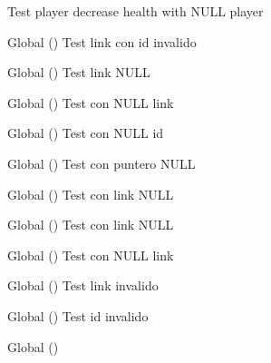 \begin{DoxyRefList}
\label{test__test000091}%
%
Test player decrease health with NULL player  
\item[Global \doxylink{link__test_8c_a24b5463da176c3e578b0a0fa8bb1f9f0}{test2\+\_\+link\+\_\+create} ()]\label{test__test000031}%
%
Test link con id invalido  
\item[Global \doxylink{link__test_8c_a63dbcd55ed0913dea30eba35884b5558}{test2\+\_\+link\+\_\+get\+\_\+direction} ()]\label{test__test000047}%
%
Test link NULL  
\item[Global \doxylink{link__test_8c_a08c6d4509d9735fedf74281866df30e1}{test2\+\_\+link\+\_\+get\+\_\+end} ()]\label{test__test000055}%
%
Test con NULL link  
\item[Global \doxylink{link__test_8c_a0f967a1782dd7264e73ad428d22d125d}{test2\+\_\+link\+\_\+get\+\_\+id} ()]\label{test__test000035}%
%
Test con NULL id  
\item[Global \doxylink{link__test_8c_a4efc6cfcdc210e2803f9d285734c571e}{test2\+\_\+link\+\_\+get\+\_\+name} ()]\label{test__test000039}%
%
Test con puntero NULL  
\item[Global \doxylink{link__test_8c_ae7fd2d7b8e2bc167b00fe8d42c065932}{test2\+\_\+link\+\_\+get\+\_\+open} ()]\label{test__test000043}%
%
Test con link NULL  
\item[Global \doxylink{link__test_8c_a8f3c929b3016b23a920994306ffc28ef}{test2\+\_\+link\+\_\+get\+\_\+start} ()]\label{test__test000051}%
%
Test con link NULL  
\item[Global \doxylink{link__test_8c_ad749dc76d3a04b2860e30dc6667b138a}{test2\+\_\+link\+\_\+print} ()]\label{test__test000057}%
%
Test con NULL link  
\item[Global \doxylink{link__test_8c_a9290046ce1c540c50cc3b7de92291fe3}{test2\+\_\+link\+\_\+set\+\_\+direction} ()]\label{test__test000045}%
%
Test link invalido  
\item[Global \doxylink{link__test_8c_af1068e666ec9be607820ec66cce2acdd}{test2\+\_\+link\+\_\+set\+\_\+end} ()]\label{test__test000053}%
%
Test id invalido  
\item[Global \doxylink{link__test_8c_a2f107a28c71f764c8091747f48eaec3f}{test2\+\_\+link\+\_\+set\+\_\+id} ()]\label{test__test000033}%
%

\end{DoxyRefList}
